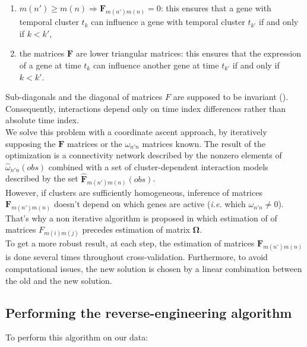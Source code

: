 \documentclass[a4paper]{article}
\renewcommand{\geq}{\geqslant}
\begin{document}
\begin{enumerate}
\item $m(n') \geq m(n) \Rightarrow \boldsymbol{F}_{m(n')m(n)} = 0$: this ensures that a gene with temporal cluster $t_k$ can influence a gene with temporal cluster $t_{k'}$ if and only if $k<k'$,
\item the matrices $ \boldsymbol{F}$ are lower triangular matrices: this ensures that the expression of a gene at time  $t_k$ can influence another gene at time $t_{k'}$ if and only if $k<k'$.
\end{enumerate}

Sub-diagonals and the diagonal of matrices $F$ are supposed to be invariant (\cite{vallat2013reverse}). Consequently, interactions depend only on time index differences rather than absolute time index. \\



We solve this problem with a coordinate ascent approach, by iteratively supposing the $ \boldsymbol{F}$ matrices or the $\omega_{n'n}$ matrices known. The result of the optimization is a connectivity network described by the nonzero elements of  $\hat{\omega}_{n'n}(obs)$ combined with a set of cluster-dependent interaction models described by the set $   \hat{\boldsymbol{F}}_{m(n')m(n)}(obs)$.\\

However, if clusters are sufficiently homogeneous, inference of matrices \linebreak 
$ \boldsymbol{F}_{m(n')m(n)}$ doesn't depend on which genes are active (\textit{i.e.} which $\omega_{n'n} \neq 0$). That's why a non iterative algorithm is proposed in which estimation of   of matrices $F_{m(i)m(j)}$  precedes estimation of matrix $\boldsymbol{\Omega}$.\\

To get a more robust result, at each step, the estimation of matrices \linebreak  $ \boldsymbol{F}_{m(n')m(n)}$ is done several times throughout cross-validation. Furthermore, to avoid computational issues, the new solution is chosen by a linear combination between the old and the new solution. 



\subsection{Performing the reverse-engineering algorithm}

To perform this algorithm on our data:
\end{document}
